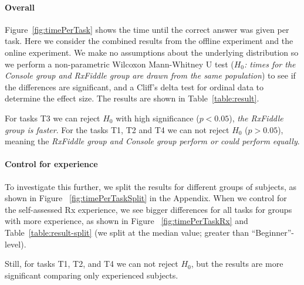 \paragraph{Overall} Figure~\ref{fig:timePerTask}
shows the time until the correct answer was given
per task.  Here we consider the combined results from the offline experiment
and the online experiment.  We make no assumptions about the underlying
distribution so we perform a non-parametric Wilcoxon Mann-Whitney U test
(\textit{$ H_0 $:  times for the Console group and RxFiddle group are
drawn from the same population}) to see if the differences are
significant, and a Cliff's delta test for ordinal data to determine the
effect size. The results are shown in Table~\ref{table:result}.

For tasks T3 we can reject $ H_0 $ with high significance ($ p < 0.05 $),
\emph{the RxFiddle group is faster}.  For the tasks T1, T2 and T4 we can
not reject $ H_0 $ ($ p > 0.05 $), meaning the \emph{RxFiddle group and
Console group perform or could perform equally}.

\paragraph{Control for experience} To investigate this further, we split
the results for different groups of subjects, as shown in Figure~%
\ref{fig:timePerTaskSplit} in the Appendix.  When we control for the
self-assessed Rx experience, we see bigger differences for all tasks for groups
with more experience, as shown in Figure~%
\ref{fig:timePerTaskRx} and Table~\ref{table:result-split} (we split at the
median value; greater than ``Beginner''-level).

Still, for tasks T1, T2, and T4 we can not reject $ H_0 $, but the
results are more significant comparing only experienced subjects.

